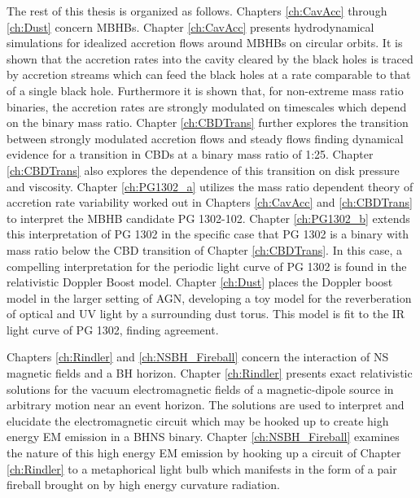 The rest of this thesis is organized as follows. Chapters \ref{ch:CavAcc}
through \ref{ch:Dust} concern MBHBs. Chapter \ref{ch:CavAcc} presents
hydrodynamical simulations for idealized accretion flows around MBHBs on
circular orbits. It is shown that the accretion rates into the cavity cleared
by the black holes is traced by accretion streams which can feed the black
holes at a rate comparable to that of a single black hole. Furthermore it is
shown that, for non-extreme mass ratio binaries, the accretion rates are
strongly modulated on timescales which depend on the binary mass ratio.
Chapter \ref{ch:CBDTrans} further explores the transition between strongly
modulated accretion flows and steady flows finding dynamical evidence for a
transition in CBDs at a binary mass ratio of 1:25. Chapter \ref{ch:CBDTrans}
also explores the dependence of this transition on disk pressure and
viscosity. Chapter \ref{ch:PG1302_a} utilizes the mass ratio dependent theory
of accretion rate variability worked out in Chapters \ref{ch:CavAcc} and
\ref{ch:CBDTrans} to interpret the MBHB candidate PG 1302-102. Chapter
\ref{ch:PG1302_b} extends this interpretation of PG 1302 in the specific case
that PG 1302 is a binary with mass ratio below the CBD transition of Chapter
\ref{ch:CBDTrans}. In this case, a compelling interpretation for the periodic
light curve of PG 1302 is found in the relativistic Doppler Boost model.
Chapter \ref{ch:Dust} places the Doppler boost model in the larger setting of
AGN, developing a toy model for the reverberation of optical and UV light by a
surrounding dust torus. This model is fit to the IR light curve of PG 1302,
finding agreement.

Chapters \ref{ch:Rindler} and \ref{ch:NSBH_Fireball} concern the interaction
of NS magnetic fields and a BH horizon. Chapter \ref{ch:Rindler}  presents
exact relativistic solutions for the vacuum electromagnetic fields of a
magnetic-dipole source in arbitrary motion near an event horizon. The
solutions are used to interpret and elucidate the electromagnetic circuit
which may be hooked up to create high energy EM emission in a BHNS binary.
Chapter \ref{ch:NSBH_Fireball} examines the nature of this high energy EM
emission by hooking up a circuit of Chapter \ref{ch:Rindler} to a metaphorical
light bulb which manifests in the form of a pair fireball brought on by high
energy curvature radiation.



















